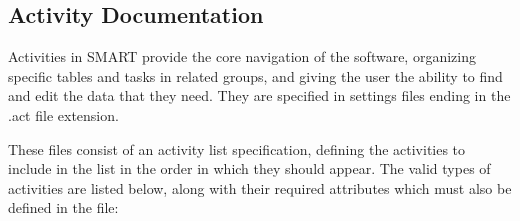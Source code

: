 \documentclass[12pt]{article}
\begin{document}
\begin{appendices}
\clearpage
\section{Activity Documentation}
Activities in SMART provide the core navigation of the software, organizing specific tables and tasks in related groups, and giving the user the ability to find and edit the data that they need. They are specified in settings files ending in the .act file extension.

These files consist of an activity list specification, defining the activities to include in the list in the order in which they should appear. The valid types of activities are listed below, along with their required attributes which must also be defined in the file:


\end{appendices}
\end{document}

